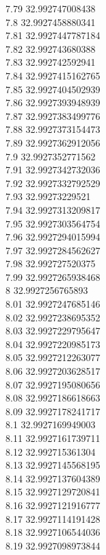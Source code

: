 {7.79	32.992747008438\\
7.8	32.9927458880341\\
7.81	32.9927447787184\\
7.82	32.992743680388\\
7.83	32.992742592941\\
7.84	32.9927415162765\\
7.85	32.9927404502939\\
7.86	32.9927393948939\\
7.87	32.9927383499776\\
7.88	32.9927373154473\\
7.89	32.9927362912056\\
7.9	32.9927352771562\\
7.91	32.9927342732036\\
7.92	32.9927332792529\\
7.93	32.99273229521\\
7.94	32.9927313209817\\
7.95	32.9927303564754\\
7.96	32.9927294015994\\
7.97	32.9927284562627\\
7.98	32.992727520375\\
7.99	32.9927265938468\\
8	32.9927256765893\\
8.01	32.9927247685146\\
8.02	32.9927238695352\\
8.03	32.9927229795647\\
8.04	32.9927220985173\\
8.05	32.9927212263077\\
8.06	32.9927203628517\\
8.07	32.9927195080656\\
8.08	32.9927186618663\\
8.09	32.9927178241717\\
8.1	32.9927169949003\\
8.11	32.9927161739711\\
8.12	32.992715361304\\
8.13	32.9927145568195\\
8.14	32.9927137604389\\
8.15	32.9927129720841\\
8.16	32.9927121916777\\
8.17	32.9927114191428\\
8.18	32.9927106544036\\
8.19	32.9927098973844\\
}
